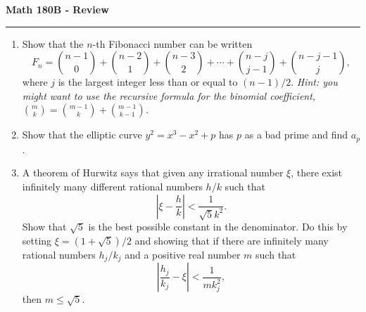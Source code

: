 \documentclass[11pt,letterpaper]{report}
\begin{document}
\begin{center}
{\bf \Large Math 180B - Review}
\vspace{0.2cm}
\hrule
\end{center}

\begin{enumerate}
	\item Show that the $n$-th Fibonacci number can be written
	\[
	F_n = \binom{n-1}{0} + \binom{n-2}{1} + \binom{n-3}{2} + \cdots  + \binom{n-j}{j-1}+\binom{n-j-1}{j},
	\]
	where $j$ is the largest integer less than or equal to $(n-1)/2$. \textit{Hint: you might want to use the recursive formula for the binomial coefficient, $\binom{m}{k} = \binom{m-1}{k}+\binom{m-1}{k-1}$.}

	\vfill

	\item Show that the elliptic curve $y^2 = x^3-x^2 + p$ has $p$ as a bad prime and find $a_p$.

	\vfill

	\item A theorem of Hurwitz says that given any irrational number $\xi$, there exist infinitely many different rational numbers $h/k$ such that
	\[
	\left|\xi - \frac{h}{k}\right| < \frac{1}{\sqrt{5}k^2}.
	\]
	Show that $\sqrt{5}$ is the best possible constant in the denominator. Do this by setting $\xi = (1+\sqrt{5})/2$ and showing that if there are infinitely many rational numbers $h_j/k_j$ and a positive real number $m$ such that
	\[
	\left|\frac{h_j}{k_j}-\xi\right|<\frac{1}{mk_j^2},
	\]
	then $m\leq \sqrt{5}$.

	\vfill
\end{enumerate}
\end{document}
